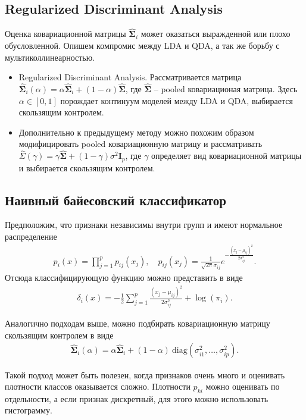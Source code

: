 \documentclass{article}
\begin{document}
\subsection{Regularized Discriminant Analysis}
Оценка ковариационной матрицы $\widehat{\mathbf{\Sigma}}_i$ может оказаться выражденной или плохо обусловленной. Опишем компромис между LDA и QDA, а так же борьбу с мультиколлинеарностью.
\begin{itemize}
  \item Regularized Discriminant Analysis. Рассматривается матрица $\widehat{\mathbf{\Sigma}}_i(\alpha) = \alpha \widehat{\mathbf{\Sigma}}_i + (1 - \alpha)\widehat{\mathbf{\Sigma}}$, где $\widehat{\mathbf{\Sigma}}$ -- pooled ковариационая матрица. Здесь $\alpha \in [0, 1]$ порождает континуум моделей между LDA и QDA, выбирается скользящим контролем.
  \item Дополнительно к предыдущему методу можно похожим образом модифицировать pooled ковариационную матрицу и рассматривать $\widehat{\Sigma}(\gamma) = \gamma \widehat{\mathbf{\Sigma}} + (1 - \gamma)\sigma^2 \mathbf{I}_p$, где $\gamma$ определяет вид ковариационной матрицы и выбирается скользящим контролем.
\end{itemize}

\subsection{Наивный байесовский классификатор}
Предположим, что признаки независимы внутри групп и имеют нормальное распределение
  \begin{align*}
    p_i(x) = \prod_{j = 1}^p p_{ij}(x_j), \quad p_{ij}(x_j) = \frac{1}{\sqrt{2\pi}\sigma_{ij}}e^{-\frac{(x_j - \mu_{ij})^2}{2\sigma^2_{ij}}}.
  \end{align*}
  Отсюда классифицирующую функцию можно представить в виде
  \begin{align*}
    \delta_i(x) = -\frac{1}{2}\sum_{j = 1}^p\frac{(x_j - \mu_{ij})^2}{2\sigma^2_{ij}} + \log(\pi_i).
  \end{align*}

Аналогично подходам выше, можно подбирать ковариационную матрицу скользящим контролем в виде
\begin{align*}
  \widehat{\mathbf{\Sigma}}_i(\alpha) = \alpha \widehat{\mathbf{\Sigma}}_i + (1 - \alpha)~\mathrm{diag}(\sigma^2_{i1}, \ldots, \sigma^2_{ip}).
\end{align*}

Такой подход может быть полезен, когда признаков очень много и оценивать плотности классов оказывается сложно. Плотности $p_{ki}$ можно оценивать по отдельности, а если признак дискретный, для этого можно использовать гистограмму.
\end{document}
